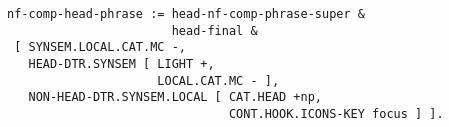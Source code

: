 \documentclass[a4paper]{article}
\begin{document}
{\small\begin{verbatim}
nf-comp-head-phrase := head-nf-comp-phrase-super & 
                       head-final &
 [ SYNSEM.LOCAL.CAT.MC -, 
   HEAD-DTR.SYNSEM [ LIGHT +,
                     LOCAL.CAT.MC - ],
   NON-HEAD-DTR.SYNSEM.LOCAL [ CAT.HEAD +np,
                               CONT.HOOK.ICONS-KEY focus ] ]. 
\end{verbatim}}
\end{document}
